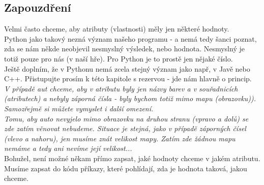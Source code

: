 \subsection{Zapouzdření}
Velmi často chceme, aby atributy (vlastnosti) měly jen některé hodnoty.\\
Python jako takový nezná význam našeho programu - a nemá tedy šanci poznat, zda se nám někde neobjevil nesmyslný výsledek, nebo hodnota. Nesmyslný je totiž pouze pro nás (v naší hře). Pro Python je to prostě jen nějaké číslo.\\
Ještě doplním, že v Pythonu nemá  zcela stejný význam jako např, v Javě nebo C++. Přistupujte prosím k této kapitole s rezervou - jde nám hlavně o princip.\\

\vspace{1cm}
\textit{V případě aut chceme, aby v atributu  byly jen názvy barev a v souřadnicích (atributech)  a  nebyly záporná čísla - byly bychom totiž mimo mapu (obrazovku)). Samozřejmě si můžete vymyslet i další omezení.\\Tomu, aby auto nevyjelo mimo obrazovku na druhou stranu (vpravo a dolů) se zde zatím věnovat nebudeme. Situace je stejná, jako v případě záporných čísel (vlevo a nahoru), jen musíme znát velikost mapy. Zatím zde žádnou mapu nemáme a tedy ani nevíme její velikost... }\\

\vspace{1cm}
Bohužel, není možné někam přímo zapsat, jaké hodnoty chceme v jakém atributu. Musíme zapsat do kódu příkazy, které pohlídají, zda je hodnota taková, jakou chceme.\\

